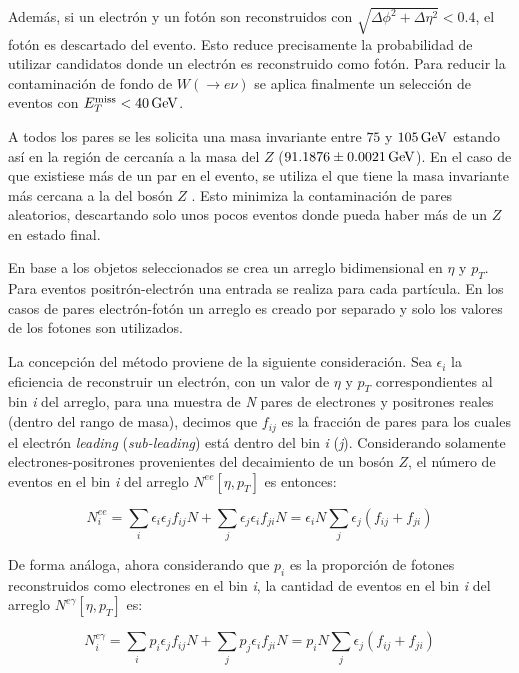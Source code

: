 Además, si un electrón y un fotón son reconstruidos con $\sqrt{\Delta\phi^{2}+\Delta\eta^{2}}<0.4$, el fotón es descartado del evento. Esto reduce precisamente la probabilidad de utilizar candidatos donde un electrón es reconstruido como fotón. Para reducir la contaminación de fondo de $W (\rightarrow e\nu)$ se aplica finalmente un selección de eventos con $E_{T}^{\text{miss}} < 40 \, \mathrm{GeV}$. 


A todos los pares se les solicita una masa invariante entre $75$ y $105 \, \mathrm{GeV}$  estando así en la región de cercanía a la masa del $Z$ ($91.1876 \pm 0.0021 \, \mathrm{GeV}$\cite{Olive:2016xmw}). En el caso de que existiese más de un par en el evento, se utiliza el que tiene la masa invariante más cercana a la del bosón $Z$ . Esto minimiza la contaminación de pares aleatorios, descartando solo unos pocos eventos donde pueda haber más de un $Z$ en estado final.


En base a los objetos seleccionados se crea un arreglo bidimensional en  $\eta$ y $p_{T}$. Para eventos positrón-electrón una entrada se realiza para cada partícula. En los casos de pares electrón-fotón un arreglo es creado por separado y solo los valores de los fotones son utilizados.

La concepción del método proviene de la siguiente consideración. Sea $\epsilon_{i}$ la eficiencia de reconstruir un electrón, con un valor de $\eta$ y $p_{T}$ correspondientes al bin \textit{i} del arreglo, para una muestra de \textit{N} pares de electrones y positrones reales (dentro del rango de masa), decimos que $f_{ij}$ es la fracción de pares para los cuales el electrón \textit{leading} (\textit{sub-leading}) está dentro del bin \textit{i} (\textit{j}). Considerando solamente electrones-positrones provenientes del decaimiento de un bosón $Z$, el número de eventos en el bin \textit{i} del arreglo $N^{ee}[\eta , p_{T}]$ es entonces:

\begin{equation}
N_{i}^{ee} = \sum_{i}\epsilon_{i}\epsilon_{j}f_{ij}N + \sum_{j}\epsilon_{j}\epsilon_{i}f_{ji}N = \epsilon_{i}N\sum_{j}\epsilon_{j}(f_{ij}+f_{ji})
\end{equation}

De forma análoga, ahora considerando que $p_{i}$ es la proporción de fotones reconstruidos como electrones en el bin \textit{i}, la cantidad de eventos en el bin \textit{i} del arreglo $N^{e\gamma}[\eta , p_{T}]$ es:

\begin{equation}
N_{i}^{e\gamma} = \sum_{i}p_{i}\epsilon_{j}f_{ij}N + \sum_{j}p_{j}\epsilon_{i}f_{ji}N = p_{i}N\sum_{j}\epsilon_{j}(f_{ij}+f_{ji})
\end{equation}

